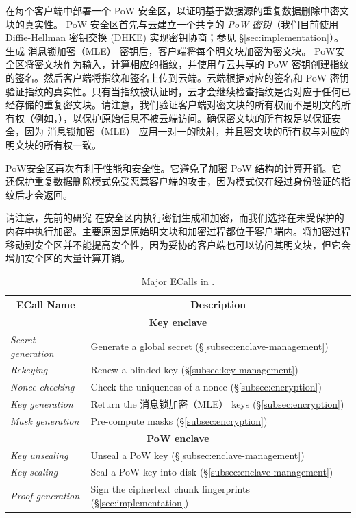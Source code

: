 \sysnameS 在每个客户端中部署一个 PoW 安全区，以证明基于数据源的重复数据删除中密文块的真实性。 PoW 安全区首先与云建立一个共享的 \textit{ PoW 密钥}（我们目前使用 Diffie-Hellman 密钥交换 (DHKE) 实现密钥协商；参见 \S\ref{sec:implementation}）。生成 消息锁加密（MLE） 密钥后，客户端将每个明文块加密为密文块。 PoW安全区将密文块作为输入，计算相应的指纹，并使用与云共享的 PoW 密钥创建指纹的签名。然后客户端将指纹和签名上传到云端。云端根据对应的签名和 PoW 密钥验证指纹的真实性。只有当指纹被认证时，云才会继续检查指纹是否对应于任何已经存储的重复密文块。请注意，我们验证客户端对密文块的所有权而不是明文的所有权（例如，\cite{halevi11}），以保护原始信息不被云端访问。确保密文块的所有权足以保证安全，因为 消息锁加密（MLE） 应用一对一的映射，并且密文块的所有权与对应的明文块的所有权一致。

PoW安全区再次有利于性能和安全性。它避免了加密 PoW 结构的计算开销。它还保护重复数据删除模式免受恶意客户端的攻击，因为模式仅在经过身份验证的指纹后才会返回。

请注意，先前的研究 \cite{kim19,fuhry20,djoko19} 在安全区内执行密钥生成和加密，而我们选择在未受保护的内存中执行加密。主要原因是原始明文块和加密过程都位于客户端内。将加密过程移动到安全区并不能提高安全性，因为妥协的客户端也可以访问其明文块，但它会增加安全区的大量计算开销。

\begin{table}[t]
\small
\centering
\begin{tabular}{|l|l|}
\hline
\multicolumn{1}{|c|}{\bf ECall Name} & \multicolumn{1}{c|}{\bf Description}\\ 
\hline
\hline
\multicolumn{2}{|c|}{\bf Key enclave} \\
\hline
\textit{ Secret generation} & Generate a global secret 
(\S\ref{subsec:enclave-management}) \\
\hline
\textit{ Rekeying} & Renew a blinded key 
(\S\ref{subsec:key-management}) \\
\hline
\textit{ Nonce checking} & Check the uniqueness of a nonce 
(\S\ref{subsec:encryption}) \\
\hline
\textit{ Key generation} & Return the 消息锁加密（MLE） keys (\S\ref{subsec:encryption}) \\
\hline
\textit{ Mask generation} & Pre-compute masks (\S\ref{subsec:encryption}) \\
\hline
\multicolumn{2}{|c|}{\bf PoW enclave} \\
\hline
  \textit{ Key unsealing} & Unseal a PoW key (\S\ref{subsec:enclave-management}) \\
\hline
  \textit{ Key sealing} & Seal a PoW key into disk (\S\ref{subsec:enclave-management})
\\
\hline
\textit{ Proof generation} & Sign the ciphertext chunk fingerprints 
(\S\ref{sec:implementation}) \\
\hline
\end{tabular}
\vspace{-6pt}
\caption{Major ECalls in \sysnameS.}
\label{tab:ecall}
\vspace{-3pt}
\end{table}


